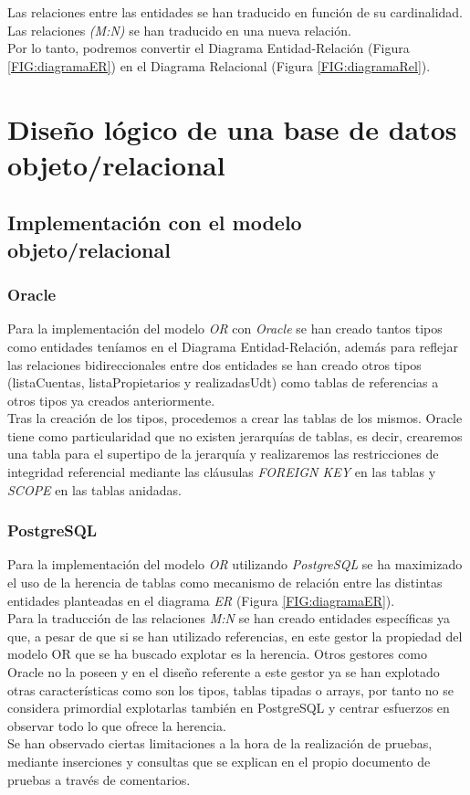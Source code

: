 \documentclass{article}
\begin{document}
Las relaciones entre las entidades se han traducido en función de su cardinalidad. Las relaciones \emph{(M:N)} se han traducido en una nueva relación.\\

Por lo tanto, podremos convertir el Diagrama Entidad-Relación (Figura \ref{FIG:diagramaER}) en el Diagrama Relacional (Figura \ref{FIG:diagramaRel}).

\newpage

\section{Diseño lógico de una base de datos objeto/relacional}
\subsection{Implementación con el modelo objeto/relacional}
\subsubsection{Oracle}
Para la implementación del modelo \emph{OR} con \emph{Oracle} se han creado tantos tipos como entidades teníamos en el Diagrama Entidad-Relación, además para reflejar las relaciones bidireccionales entre dos entidades se han creado otros tipos (listaCuentas, listaPropietarios y realizadasUdt) como tablas de referencias a otros tipos ya creados anteriormente.
\\
Tras la creación de los tipos, procedemos a crear las tablas de los mismos. Oracle tiene como particularidad que no existen jerarquías de tablas, es decir, crearemos una tabla para el supertipo de la jerarquía y realizaremos las restricciones de integridad referencial mediante las cláusulas \emph{FOREIGN KEY} en las tablas y \emph{SCOPE} en las tablas anidadas.
\\

\subsubsection{PostgreSQL}

Para la implementación del modelo \emph{OR} utilizando \emph{PostgreSQL} se ha maximizado el uso de la herencia de tablas como mecanismo de relación entre las distintas entidades planteadas en el diagrama \emph{ER} (Figura \ref{FIG:diagramaER}).\\
Para la traducción de las relaciones \emph{M:N} se han creado entidades específicas ya que, a pesar de que si se han utilizado referencias, en este gestor la propiedad del modelo OR que se ha buscado explotar es la herencia. Otros gestores como Oracle no la poseen y en el diseño referente a este gestor ya se han explotado otras características como son los tipos, tablas tipadas o arrays, por tanto no se considera primordial explotarlas también en PostgreSQL y centrar esfuerzos en observar todo lo que ofrece la herencia.\\
Se han observado ciertas limitaciones a la hora de la realización de pruebas, mediante inserciones y consultas que se explican en el propio documento de pruebas a través de comentarios.\\
\\
\end{document}
